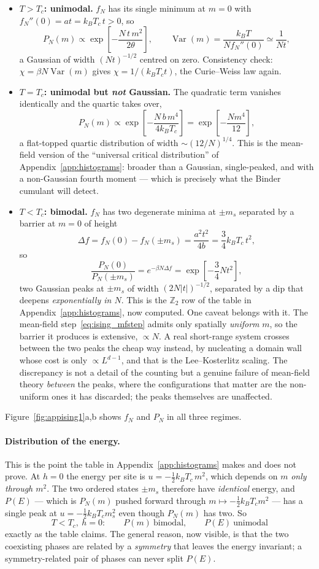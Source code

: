 \documentclass[10pt,a4paper]{article}
\theoremstyle{remark}
\newcommand{\Var}{\operatorname{Var}}
\begin{document}
\begin{itemize}
\item \textbf{$T>T_c$: unimodal.} $f_N$ has its single minimum at $m=0$ with
$f_N''(0)=at=k_BT_c\,t>0$, so
\[
P_N(m)\propto\exp\left[-\frac{N\,t\,m^{2}}{2\theta}\right],
\qquad
\Var(m)=\frac{k_BT}{N f_N''(0)}\simeq\frac{1}{N t} ,
\]
a Gaussian of width $(Nt)^{-1/2}$ centred on zero. Consistency check:
$\chi=\beta N\Var(m)$ gives $\chi=1/(k_BT_ct)$, the Curie--Weiss law again.
\item \textbf{$T=T_c$: unimodal but \emph{not} Gaussian.} The quadratic term
vanishes identically and the quartic takes over,
\[
P_N(m)\propto\exp\left[-\frac{N\,b\,m^{4}}{4k_BT_c}\right]
=\exp\left[-\frac{N m^{4}}{12}\right],
\]
a flat-topped quartic distribution of width $\sim(12/N)^{1/4}$. This is the
mean-field version of the ``universal critical distribution'' of
Appendix~\ref{app:histograms}: broader than a Gaussian, single-peaked, and with a
non-Gaussian fourth moment --- which is precisely what the Binder cumulant will
detect.
\item \textbf{$T<T_c$: bimodal.} $f_N$ has two degenerate minima at $\pm m_s$
separated by a barrier at $m=0$ of height
\[
\Delta f=f_N(0)-f_N(\pm m_s)=\frac{a^{2}t^{2}}{4b}=\frac{3}{4}k_BT_c\,t^{2} ,
\]
so
\[
\frac{P_N(0)}{P_N(\pm m_s)}=e^{-\beta N\Delta f}
=\exp\left[-\frac{3}{4}N t^{2}\right],
\]
two Gaussian peaks at $\pm m_s$ of width $(2N|t|)^{-1/2}$, separated by a dip that
deepens \emph{exponentially in $N$}. This is the $\mathbb{Z}_2$ row of the table in
Appendix~\ref{app:histograms}, now computed. One caveat belongs with it. The
mean-field step~\eqref{eq:ising_mfstep} admits only spatially \emph{uniform} $m$,
so the barrier it produces is extensive, $\propto N$. A real short-range system
crosses between the two peaks the cheap way instead, by nucleating a domain wall
whose cost is only $\propto L^{d-1}$, and that is the Lee--Kosterlitz scaling.
The discrepancy is not a detail of the counting but a genuine failure of
mean-field theory \emph{between} the peaks, where the configurations that matter
are the non-uniform ones it has discarded; the peaks themselves are unaffected.
\end{itemize}
Figure~\ref{fig:appising1}a,b shows $f_N$ and $P_N$ in all three regimes.

\paragraph{Distribution of the energy.} This is the point the table in
Appendix~\ref{app:histograms} makes and does not prove. At $h=0$ the energy per
site is $u=-\tfrac12k_BT_c\,m^{2}$, which depends on $m$ \emph{only through
$m^{2}$}. The two ordered states $\pm m_s$ therefore have \emph{identical} energy,
and $P(E)$ --- which is $P_N(m)$ pushed forward through $m\mapsto
-\tfrac12k_BT_cm^{2}$ --- has a single peak at $u=-\tfrac12k_BT_cm_s^{2}$ even
though $P_N(m)$ has two. So
\[
\;T<T_c,\ h=0:\qquad P(m)\ \text{bimodal},\qquad P(E)\ \text{unimodal}\
\]
exactly as the table claims. The general reason, now visible, is that the two
coexisting phases are related by a \emph{symmetry} that leaves the energy
invariant; a symmetry-related pair of phases can never split $P(E)$.
\end{document}
